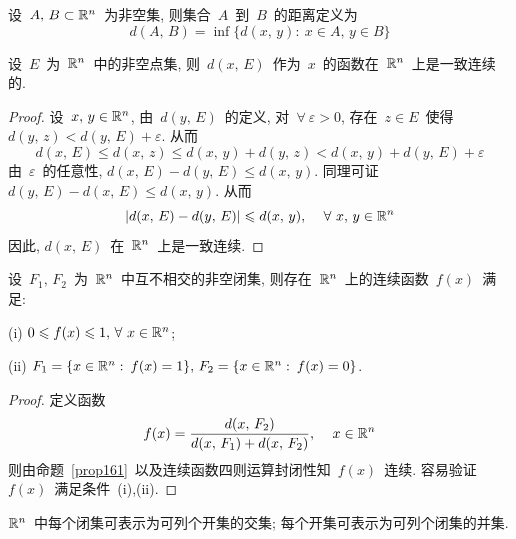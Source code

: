 设~$A,\,B \subset \mathbb{R}^n$~为非空集, 则集合~$A$~到~$B$~的距离定义为
\[
d(A,\,B) = \inf\big\{d(x,\,y):\: x \in A,\,y \in B\big\}
\]

\begin{proposition} \label{prop161}
设~$E$~为~$\mathbb{R}^n$~中的非空点集, 则~$d(x,\,E)$~作为~$x$~的函数在~$\mathbb{R}^n$~上是一致连续的.
\end{proposition}

\begin{proof}
设~$x,\,y \in \mathbb{R}^n$, 由~$d(y,\,E)$~的定义, 对~$\forall~\varepsilon > 0$, 存在~$z \in E$~使得~$d(y,\,z) < d(y,\, E) + \varepsilon$. 从而
\[
d(x,\,E) \leqslant d(x,\,z) \leqslant d(x,\,y) + d(y,\,z) < d(x,\,y) + d(y,\, E) + \varepsilon
\]
由~$\varepsilon$~的任意性, $d(x,\,E) - d(y,\,E) \leqslant d(x,\,y)$. 同理可证~$d(y,\,E) - d(x,\,E) \leqslant d(x,\,y)$. 从而
\[
|d(x,\,E) - d(y,\,E)| \leqslant d(x,\,y), \, \quad  \forall~x,\,y \in \mathbb{R}^n
\]
因此, $d(x,\,E)$~在~$\mathbb{R}^n$~上是一致连续.
\end{proof}

\begin{proposition}
设~$F_1,\,F_2$~为~$\mathbb{R}^n$~中互不相交的非空闭集, 则存在~$\mathbb{R}^n$~上的连续函数~$f(x)$~满足:

(i) $0 \leqslant f(x) \leqslant 1, \, \forall~x \in \mathbb{R}^n$;

(ii) $F_1 = \{x \in \mathbb{R}^n: \: f(x) = 1\}, \, F_2 = \{x \in \mathbb{R}^n: \: f(x) = 0\}$.
\end{proposition}

\begin{proof}
定义函数
\[
f(x) = \frac{d(x,\,F_2)}{d(x,\,F_1) + d(x,\,F_2)}, \, \quad x \in \mathbb{R}^n
\]
则由命题~\ref{prop161}~以及连续函数四则运算封闭性知~$f(x)$~连续.
容易验证~$f(x)$~满足条件~(i),(ii).
\end{proof}

\begin{proposition}
$\mathbb{R}^n$~中每个闭集可表示为可列个开集的交集; 每个开集可表示为可列个闭集的并集.
\end{proposition}

